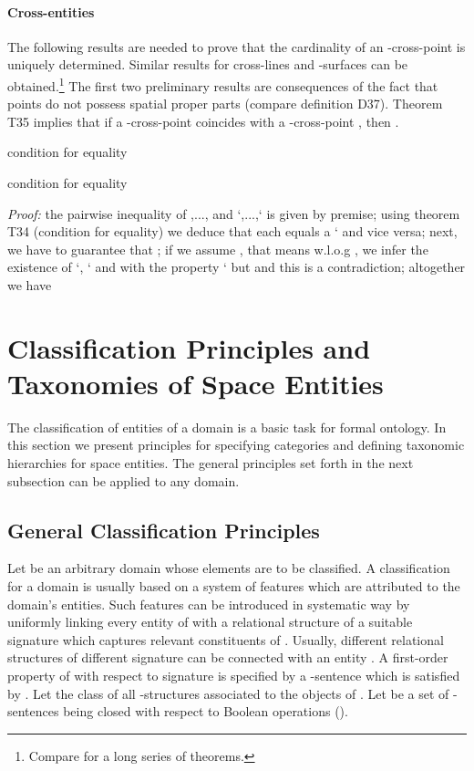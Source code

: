 \documentclass{ao2e}
\begin{document}
{\paragraph{Cross-entities} 
The following results are needed to prove that the cardinality of an -cross-point is uniquely determined. Similar results for cross-lines and -surfaces can be obtained.\footnote{Compare \cite{baumann-r-2009-a} for a long series of theorems.} The first two preliminary results are consequences of the fact that points do not possess spatial proper parts (compare definition D37). Theorem T35 implies that if a -cross-point
 coincides with a -cross-point , then . 

\begin{enumAx}[T]
\itemTP{\1ex] \mbox{}}
            {condition for equality}	
											
\itemTP{ \1ex] \mbox{}}
            {condition for equality}	
\end{enumAx} 
						
\noindent \textit{Proof:}	the pairwise inequality of  ,..., and `,...,` is given by premise; using theorem T34 (condition for equality) we deduce that each  equals a ` and vice versa; next, we have to guarantee that ; if we assume , that means w.l.o.g , we infer the existence of `, ` and  with the property ` but  and this is a contradiction; altogether we have  \hfill   



						





\section{Classification Principles and Taxonomies of Space Entities}

The classification of entities of a domain is a basic task for formal ontology. In this section
we present principles for specifying categories and defining taxonomic hierarchies for space entities.
The general principles set forth in the next subsection can be applied to any domain.



\subsection{General Classification Principles}
Let  be an arbitrary domain whose elements are to be classified. A classification for a domain 
is usually based on a system of features which are attributed to the domain's entities. Such features can be
introduced in systematic way by uniformly linking every entity  of  with a relational structure
 of a suitable signature  which captures relevant constituents of .
Usually, different relational structures of different signature can be connected with an entity . A first-order property of  with respect to signature  is specified by a -sentence  which is satisfied by . Let  the class of
all -structures associated to the objects of . Let  be a set of -sentences being closed with respect to Boolean operations ().

}
\end{document}

